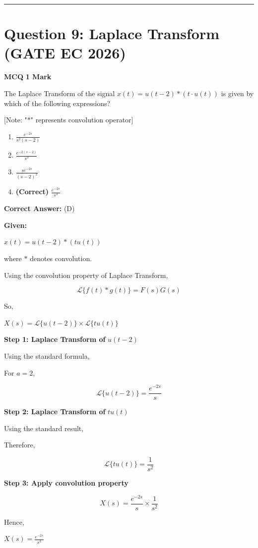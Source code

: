 \documentclass[11pt,a4paper]{article}
\begin{document}
\vspace{1.5em}
\hrule
\vspace{1.5em}

\section*{Question 9: Laplace Transform (GATE EC 2026)}
\noindent \textbf{\color{primary}MCQ} \hfill \textbf{\color{secondary}1 Mark}


\noindent The Laplace Transform of the signal $x(t) = u(t - 2) * (t \cdot u(t))$ is given by which of the following expressions? 

[Note: "$*$" represents convolution operator]


\begin{enumerate}[label=(\Alph*)]
    \item $\frac{e^{-2s}}{s^2(s - 2)}$
    \item $\frac{e^{-2(s-2)}}{s^3}$
    \item $\frac{se^{-2s}}{(s - 2)^2}$
    \item \textbf{(Correct)} $\frac{e^{-2s}}{s^3}$
\end{enumerate}

\noindent \textbf{Correct Answer:} (D)

\begin{tcolorbox}[solbox, title=Detailed Solution -- Question 9]
\textbf{Given:}

$x(t)=u(t-2)*(tu(t))$

where $*$ denotes convolution.

Using the convolution property of Laplace Transform,

\[
\mathcal{L}\{f(t)*g(t)\}
=
F(s)G(s)
\]

So,

$X(s)=\mathcal{L}\{u(t-2)\}\times \mathcal{L}\{tu(t)\}$

\textbf{Step 1: Laplace Transform of} $u(t-2)$

Using the standard formula,

For $a=2$,

\[
\mathcal{L}\{u(t-2)\}
=
\frac{e^{-2s}}{s}
\]

\textbf{Step 2: Laplace Transform of} $tu(t)$

Using the standard result,

Therefore,

\[
\mathcal{L}\{tu(t)\}
=
\frac{1}{s^2}
\]

\textbf{Step 3: Apply convolution property}

\[
X(s)
=
\frac{e^{-2s}}{s}\times\frac{1}{s^2}
\]

Hence,

$X(s)=\frac{e^{-2s}}{s^3}$
\end{tcolorbox}
\end{document}
